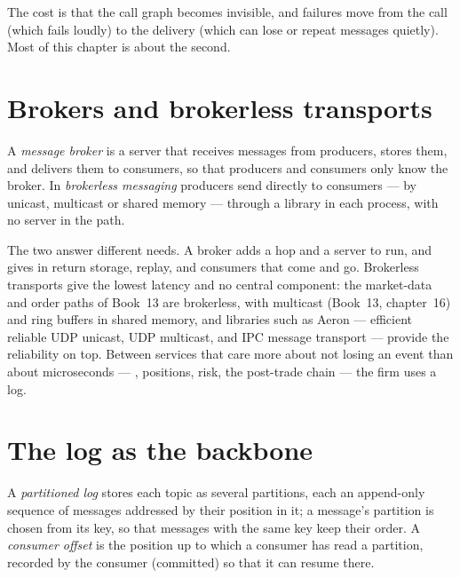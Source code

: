 The cost is that the call graph becomes invisible, and failures move from the call (which fails loudly) to the delivery (which can lose or
repeat messages quietly). Most of this chapter is about the second.

\section{Brokers and brokerless transports}

\begin{definition}\label{def:pl:messaging-and-event-driven-architecture:broker}
A \emph{message broker} is a server that receives messages from producers, stores them, and delivers them to consumers,
so that producers and consumers only know the broker. In \emph{brokerless messaging} producers send directly to
consumers --- by unicast, multicast or shared memory --- through a library in each process, with no server in the path.
\end{definition}

The two answer different needs. A broker adds a hop and a server to run, and gives in return storage, replay, and consumers that come and go.
Brokerless transports give the lowest latency and no central component: the market-data and order paths of Book~13 are brokerless, with
multicast (Book~13, chapter~16) and ring buffers in shared memory, and libraries such as Aeron --- \textquotedbl{}efficient reliable UDP
unicast, UDP multicast, and IPC message transport\textquotedbl{} --- provide the reliability on top. Between services that care more about
not losing an event than about microseconds --- , positions, risk, the post-trade chain --- the firm uses a log.

\section{The log as the backbone}

\begin{definition}\label{def:pl:messaging-and-event-driven-architecture:log}
A \emph{partitioned log} stores each topic as several partitions, each an append-only sequence of messages addressed by
their position in it; a message's partition is chosen from its key, so that messages with the same key keep their order. A \emph{consumer
offset} is the position up to which a consumer has read a partition, recorded by the consumer (committed) so that it
can resume there.
\end{definition}

